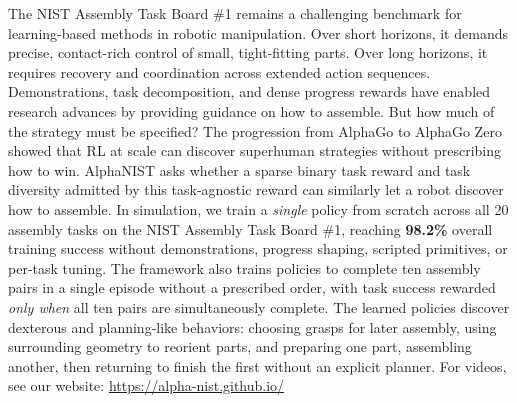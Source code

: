 The NIST Assembly Task Board \#1 remains a challenging benchmark for learning-based methods in robotic manipulation.
Over short horizons, it demands precise, contact-rich control of small, tight-fitting parts.
Over long horizons, it requires recovery and coordination across extended action sequences.
Demonstrations, task decomposition, and dense progress rewards have enabled research advances by providing guidance on how to assemble.
But how much of the strategy must be specified?
The progression from AlphaGo to AlphaGo Zero showed that RL at scale can discover superhuman strategies without prescribing how to win.
AlphaNIST asks whether a sparse binary task reward and task diversity admitted by this task-agnostic reward can similarly let a robot discover how to assemble.
In simulation, we train a \textit{single} policy from scratch across all 20 assembly tasks on the NIST Assembly Task Board \#1, reaching \textbf{98.2\%} overall training success without demonstrations, progress shaping, scripted primitives, or per-task tuning.
The framework also trains policies to complete ten assembly pairs in a single episode without a prescribed order, with task success rewarded \textit{only when} all ten pairs are simultaneously complete.
The learned policies discover dexterous and planning-like behaviors: choosing grasps for later assembly, using surrounding geometry to reorient parts, and preparing one part, assembling another, then returning to finish the first without an explicit planner.
For videos, see our website: \url{https://alpha-nist.github.io/}

